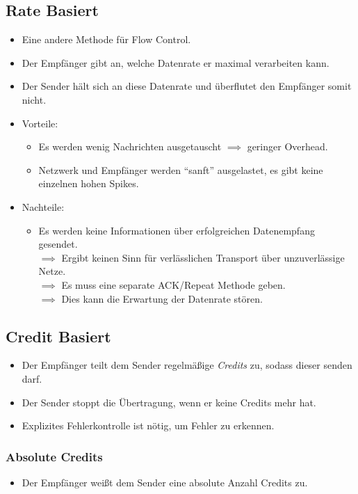 		\subsection{Rate Basiert}
			\begin{itemize}
				\item Eine andere Methode für Flow Control.
				\item Der Empfänger gibt an, welche Datenrate er maximal verarbeiten kann.
				\item Der Sender hält sich an diese Datenrate und überflutet den Empfänger somit nicht.
				\item Vorteile:
					\begin{itemize}
						\item Es werden wenig Nachrichten ausgetauscht \(\implies\) geringer Overhead.
						\item Netzwerk und Empfänger werden \enquote{sanft} ausgelastet, es gibt keine einzelnen hohen Spikes.
					\end{itemize}
				\item Nachteile:
					\begin{itemize}
						\item Es werden keine Informationen über erfolgreichen Datenempfang gesendet. \\ \(\implies\) Ergibt keinen Sinn für verlässlichen Transport über unzuverlässige Netze. \\ \(\implies\) Es muss eine separate ACK/Repeat Methode geben. \\ \(\implies\) Dies kann die Erwartung der Datenrate stören.
					\end{itemize}
			\end{itemize}

		\subsection{Credit Basiert}
			\begin{itemize}
				\item Der Empfänger teilt dem Sender regelmäßige \textit{Credits} zu, sodass dieser senden darf.
				\item Der Sender stoppt die Übertragung, wenn er keine Credits mehr hat.
				\item Explizites Fehlerkontrolle ist nötig, um Fehler zu erkennen.
			\end{itemize}

			\subsubsection{Absolute Credits}
				\begin{itemize}
					\item Der Empfänger weißt dem Sender eine absolute Anzahl Credits zu.
				\end{itemize}

